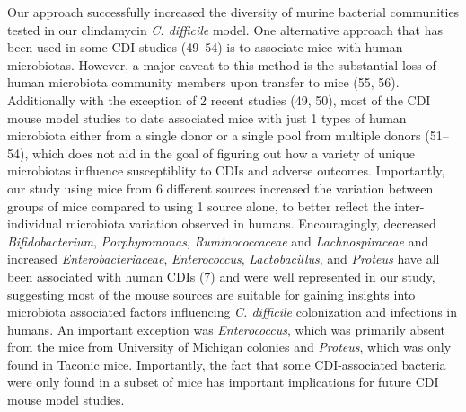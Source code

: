 \documentclass[11pt,]{article}
\begin{document}
Our approach successfully increased the diversity of murine bacterial
communities tested in our clindamycin \emph{C. difficile} model. One
alternative approach that has been used in some CDI studies (49--54) is
to associate mice with human microbiotas. However, a major caveat to
this method is the substantial loss of human microbiota community
members upon transfer to mice (55, 56). Additionally with the exception
of 2 recent studies (49, 50), most of the CDI mouse model studies to
date associated mice with just 1 types of human microbiota either from a
single donor or a single pool from multiple donors (51--54), which does
not aid in the goal of figuring out how a variety of unique microbiotas
influence susceptiblity to CDIs and adverse outcomes. Importantly, our
study using mice from 6 different sources increased the variation
between groups of mice compared to using 1 source alone, to better
reflect the inter-individual microbiota variation observed in humans.
Encouragingly, decreased \emph{Bifidobacterium}, \emph{Porphyromonas},
\emph{Ruminococcaceae} and \emph{Lachnospiraceae} and increased
\emph{Enterobacteriaceae}, \emph{Enterococcus}, \emph{Lactobacillus},
and \emph{Proteus} have all been associated with human CDIs (7) and were
well represented in our study, suggesting most of the mouse sources are
suitable for gaining insights into microbiota associated factors
influencing \emph{C. difficile} colonization and infections in humans.
An important exception was \emph{Enterococcus}, which was primarily
absent from the mice from University of Michigan colonies and
\emph{Proteus}, which was only found in Taconic mice. Importantly, the
fact that some CDI-associated bacteria were only found in a subset of
mice has important implications for future CDI mouse model studies.
\end{document}
